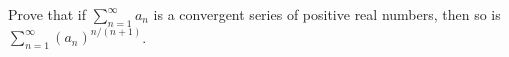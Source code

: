 Prove that if $\sum_{n=1}^\infty a_n$ is a convergent series of
positive real numbers, then so is $\sum_{n=1}^\infty (a_n)^{n/(n+1)}$.
